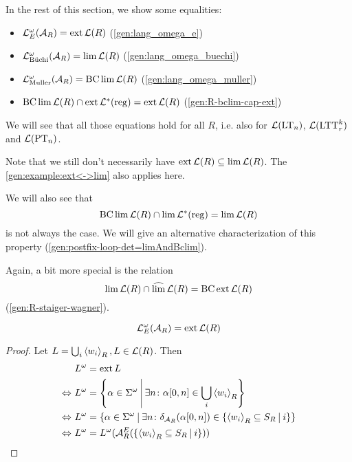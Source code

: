 In the rest of this section, we show some equalities:
\begin{itemize}
\item $\mathcal{L}^\omega_E(\mathcal{A}_R) = \operatorname{ext} \mathcal{L}(R)$ (\cref{gen:lang_omega_e})
\item $\mathcal{L}^\omega_{\text{Büchi}}(\mathcal{A}_R) = \lim \mathcal{L}(R)$ (\cref{gen:lang_omega_buechi})
\item $\mathcal{L}^\omega_{\text{Muller}}(\mathcal{A}_R) = \operatorname{BC} \lim \mathcal{L}(R)$ (\cref{gen:lang_omega_muller})
\item $\operatorname{BC} \lim \mathcal{L}(R) \cap \operatorname{ext} \mathcal{L}^*(\textup{\textrm{reg}}) = \operatorname{ext} \mathcal{L}(R)$ (\cref{gen:R-bclim-cap-ext})
\end{itemize}

We will see that all those equations hold for all $R$, i.e. also for $\mathcal{L}(\textup{\textrm{LT}}_n)$, $\mathcal{L}(\textup{\textrm{LTT}}^k_r)$ and $\mathcal{L}(\textup{\textrm{PT}}_n)$.

Note that we still don't necessarily have $\operatorname{ext} \mathcal{L}(R) \subseteq \lim \mathcal{L}(R)$. The \cref{gen:example:ext<->lim} also applies here.

We will also see that
\[ \operatorname{BC} \lim \mathcal{L}(R) \cap \lim \mathcal{L}^*(\textup{\textrm{reg}}) = \lim \mathcal{L}(R) \]
is not always the case. We will give an alternative characterization of this property (\cref{gen:postfix-loop-det=limAndBclim}).

Again, a bit more special is the relation
\[ \lim \mathcal{L}(R) \cap \operatorname{\widehat{lim}} \mathcal{L}(R) = \operatorname{BC} \operatorname{ext} \mathcal{L}(R) \]
(\cref{gen:R-staiger-wagner}).

\begin{lemma}
\label{gen:lang_omega_e}
\[ \mathcal{L}^\omega_E(\mathcal{A}_R) = \operatorname{ext} \mathcal{L}(R) \]
\begin{proof}
Let $L = \bigcup_i \left< w_i\right>_R, L \in \mathcal{L}(R)$. Then
\begin{align*}
& L^\omega = \ext L \\
\Leftrightarrow \ & L^\omega = \Set{\alpha \in \Sigma^\omega}{\exists n \colon \alpha[0,n] \in \bigcup_i \left< w_i\right>_R} \\
\Leftrightarrow \ & L^\omega = \Set{\alpha \in \Sigma^\omega}{\exists n \colon \delta_{\A_R}(\alpha[0,n]) \in \Set{\left< w_i\right>_R \subseteq S_R}{i}} \\
\Leftrightarrow \ & L^\omega = L^\omega(\A^E_R(\Set{\left< w_i\right>_R \subseteq S_R}{i}))
\end{align*}
\end{proof}
\end{lemma}


